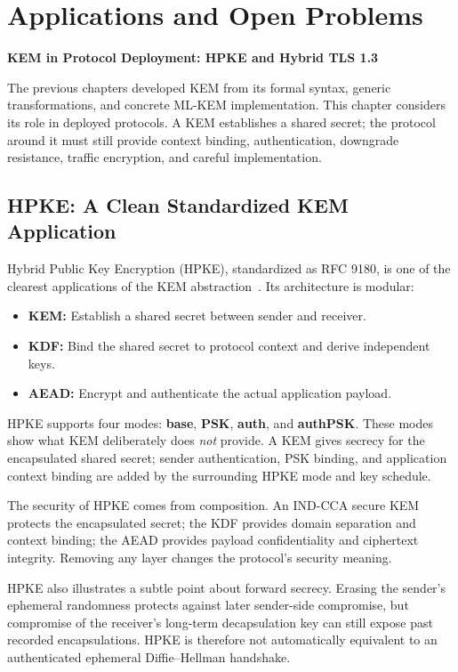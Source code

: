 \chapter{Applications and Open Problems}
\begin{center}
\large \textbf{KEM in Protocol Deployment: HPKE and Hybrid TLS 1.3}
\end{center}
\vspace{1em}

The previous chapters developed KEM from its formal syntax, generic transformations, and concrete ML-KEM implementation. This chapter considers its role in deployed protocols. A KEM establishes a shared secret; the protocol around it must still provide context binding, authentication, downgrade resistance, traffic encryption, and careful implementation.

\section{HPKE: A Clean Standardized KEM Application}

Hybrid Public Key Encryption (HPKE), standardized as RFC 9180, is one of the clearest applications of the KEM abstraction~\cite{rfc9180}. Its architecture is modular:
\begin{itemize}
    \item \textbf{KEM:} Establish a shared secret between sender and receiver.
    \item \textbf{KDF:} Bind the shared secret to protocol context and derive
    independent keys.
    \item \textbf{AEAD:} Encrypt and authenticate the actual application
    payload.
\end{itemize}

HPKE supports four modes: \textbf{base}, \textbf{PSK}, \textbf{auth}, and \textbf{authPSK}. These modes show what KEM deliberately does \textit{not} provide. A KEM gives secrecy for the encapsulated shared secret; sender authentication, PSK binding, and application context binding are added by the surrounding HPKE mode and key schedule.

The security of HPKE comes from composition. An IND-CCA secure KEM protects the encapsulated secret; the KDF provides domain separation and context binding; the AEAD provides payload confidentiality and ciphertext integrity. Removing any layer changes the protocol's security meaning.

HPKE also illustrates a subtle point about forward secrecy. Erasing the sender's ephemeral randomness protects against later sender-side compromise, but compromise of the receiver's long-term decapsulation key can still expose past recorded encapsulations. HPKE is therefore not automatically equivalent to an authenticated ephemeral Diffie--Hellman handshake.

